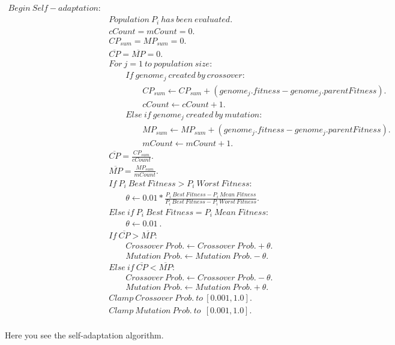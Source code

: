 \documentclass[a4paper,10pt]{article}
\begin{document}
\begin{figure}[H]
\begin{equation*}
\boxed{
\begin{aligned}
Begin \ Self\!-\!adaptation: & \\
& Population \ P_i \ has \ been \ evaluated. \\
& cCount = mCount = 0. \\
& CP_{sum} = MP_{sum} = 0. \\
& \overline{CP} = \overline{MP} = 0. \\
& For \ j = 1 \ to \ population \ size: \\
& \quad\quad If \ genome_j \ created \ by \ crossover: \\
& \quad\quad\quad\quad CP_{sum} \longleftarrow CP_{sum} + ( genome_j.fitness - genome_j.parentFitness ). \\
& \quad\quad\quad\quad cCount \longleftarrow cCount + 1. \\
& \quad\quad Else \ if \ genome_j \ created \ by \ mutation: \\
& \quad\quad\quad\quad MP_{sum} \longleftarrow MP_{sum} + (genome_j.fitness - genome_j.parentFitness). \\
& \quad\quad\quad\quad mCount \longleftarrow mCount + 1. \\
& \overline{CP} = \frac{CP_{sum}}{cCount}. \\
& \overline{MP} = \frac{MP_{sum}}{mCount}. \\
& If \ P_i \ Best \ Fitness > P_i \ Worst \ Fitness: \\
& \quad\quad \theta \longleftarrow 0.01 * \frac{P_i \ Best \ Fitness - P_i \ Mean \ Fitness }{P_i \ Best \ Fitness - P_i \ Worst \ Fitness }.\\
& Else  \ if \ P_i \ Best \ Fitness = P_i \ Mean \ Fitness: \\
& \quad\quad \theta \longleftarrow 0.01  \ . \\
& If \ \overline{CP} > \overline{MP}: \\
& \quad\quad Crossover \ Prob. \longleftarrow Crossover \ Prob. + \theta. \\
& \quad\quad Mutation \ Prob. \longleftarrow Mutation \ Prob. - \theta. \\
& Else \ if \ \overline{CP} < \overline{MP}: \\
& \quad\quad Crossover \ Prob. \longleftarrow Crossover \ Prob. - \theta. \\
& \quad\quad Mutation \ Prob. \longleftarrow Mutation \ Prob. + \theta. \\
& Clamp \ Crossover \ Prob. \ to \ [0.001, 1.0]. \\
& Clamp \ Mutation \ Prob. \ to \ \ [0.001, 1.0]. \\
\end{aligned}
}
\end{equation*}
\caption{Here you see the self-adaptation algorithm.}
\label{fig:sa}
\end{figure}
\end{document}
